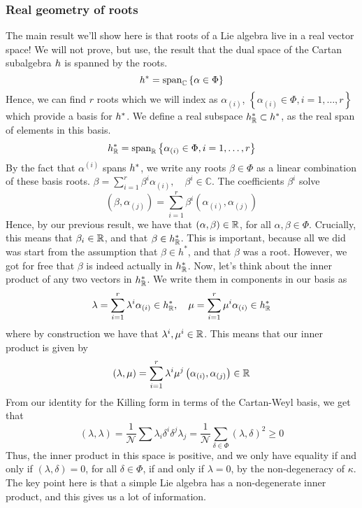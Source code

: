 \subsubsection{Real geometry of roots} 
The main result we'll show here is 
that roots of a Lie algebra live in  
a real vector space! 
We will not prove, but use, the result 
that the dual space of the Cartan subalgebra  $ h $ 
is spanned by the roots. 
\[
h ^ *  = \text{span} _{ \mathbb { C} } \left\{  
\alpha \in \Phi \right\}  
\] Hence, we can find $ r $ roots 
which we will index as $ \alpha _{ ( i )  } $, 
$ \left\{  \alpha_{ \left(  i  \right)  } \in \Phi, i = 1 , \dots, r  \right\}   $ 
which provide a basis for $ h  ^ * $. 
We define a real subspace $ h^ * _{ \mathbb{ R} } \subset 
h ^ * $, as the real span of elements in this basis. 
\[
h^ * _{ \mathbb{R} }  = \text{span}_{ \mathbb{R} } \left\{  
\alpha _{ \left(  i  \right)  } \in \Phi , i =  1 , \dots, r \right\}  
\] 
By the fact that $ \alpha ^{ ( i ) } $ spans $ h ^ * $, 
we write any roots $ \beta \in \Phi $  as a linear combination 
of these basis roots. 
$ \beta = \sum_{ i  = 1} ^ r \beta ^ i \alpha _{ ( i ) } , \quad \beta ^ i \in 
\mathbb{ C} $. The coefficients $ \beta ^ i  $  solve 
\[
\left( \beta , \alpha _{ ( j ) } \right)   = 
\sum_{ i  =1 } ^ r \beta ^ i \left(  \alpha _{( i ) } , \alpha _{ ( j ) } \right)   
\] Hence, by our previous result, 
we have that $ \left(  \alpha, \beta  \right)  \in \mathbb{R} $, 
for all $ \alpha , \beta \in \Phi  $. 
Crucially, this means that $ \beta _ i \in \mathbb{R} $, and that 
$ \beta \in h ^ * _{ \mathbb{R} } $. This 
is important, because all we did was 
start from the assumption that 
$ \beta \in h ^ * $, and that $ \beta $ was a root. 
However, we got for free that $ \beta $ is indeed 
actually in $ h _{ \mathbb{R} } ^ * $. 
Now, let's think about the inner product 
of any two vectors in $ h ^ *_{ \mathbb{R} } $. 
We write them in components in our basis as 
\[
\lambda = \sum_{ i = 1 } ^ r \lambda ^ i \alpha _{ ( i ) } \in 
h ^ * _{ \mathbb{R} } , \quad \mu = \sum_{ i = 1 } ^ r \mu ^ i 
\alpha _{ ( i ) } \in h ^ * _{ \mathbb{R} } 
\] where by construction we have that $ \lambda ^ i , \mu ^ i \in \mathbb{R} $. 
This means that our inner product is given by 
\[
\left(  \lambda , \mu  \right)   = \sum_{ i =1 }^ r 
\lambda ^ i \mu ^ j \left(  \alpha _{ ( i ) } , \alpha_{ ( j ) }  \right)  \in 
\mathbb{R} 
\]  From our identity for the Killing form 
in terms of the Cartan-Weyl basis, we get that 
\[
( \lambda , \lambda )  = \frac{1}{\mathcal{ N } } \sum 
\lambda _ i \delta ^ i \delta ^ j \lambda _ j  = \frac{1}{\mathcal{ N } } 
\sum_{ \delta \in \Phi } ( \lambda , \delta ) ^ 2 \geq 0 
\] Thus, the inner product 
in this space is positive, and we only have equality 
if and only if $ \left(  \lambda , \delta  \right)   =0 $, 
for all $ \delta \in \Phi $, if and only if $ \lambda = 0 $, 
by the non-degeneracy of $ \kappa $. 
The key point here is that a simple Lie algebra 
has a non-degenerate inner product, and this gives 
us a lot of information. 

